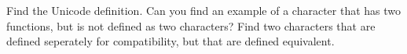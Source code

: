 Find the Unicode definition. Can you find an example of a
character that has two functions, but is not defined as two
characters? Find two characters that are defined seperately for
compatibility, but that are defined equivalent.
